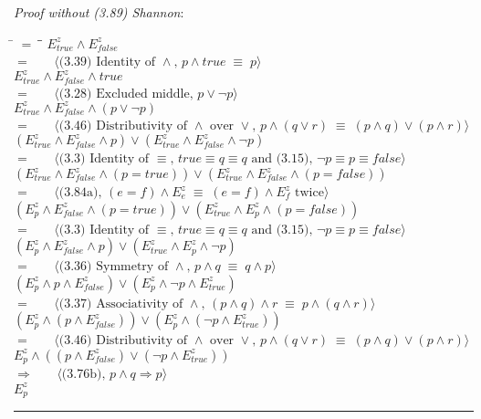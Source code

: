 \documentclass[12pt, fleqn, leqno]{article}
\newcommand{\lgap}{2pt}                             %
\newcommand{\mymathindent}{24pt}                    %
\newcommand{\equivs}{\ensuremath{\;\equiv\;}}       %
\newcommand{\impl}{\ensuremath{\Rightarrow}}        %
\newcommand{\myqed}{\rule[-.23ex]{1.2ex}{2.0ex}}
\newcommand{\myqedtab}{\hspace{384pt}}              %
\newcommand{\Gll} {\langle}                         %
\newcommand{\Ggg} {\rangle}                         %
\newcommand{\Hint}[1]     {\ \ \ $\Gll              \mbox{#1} \Ggg$ }   %
\begin{document}
\emph{Proof without (3.89) Shannon}:
\begin{tabbing}
\hspace{\mymathindent} \= $= \;$ \= \myqedtab \= \kill
	\> \>  $E^{z}_{true}\land E^{z}_{false}$\\
	\> $=$  \>  \Hint{(3.39) Identity of $\land$, $p \land true \equivs p$}\\[\lgap]
	\> \>   $E^{z}_{true}\land E^{z}_{false}\land {true}$\\
	\> $=$  \>  \Hint{(3.28) Excluded middle, $p \lor \lnot p$}\\[\lgap]
	\> \>   $E^{z}_{true}\land E^{z}_{false}\land(p\lor\lnot p)$\\
	\> $=$  \>  \Hint{(3.46) Distributivity of $\land$ over $\lor$, $p \land (q \lor r) \equivs (p \land q) \lor (p \land r)$}\\[\lgap]
	\> \>   $(E^{z}_{true}\land E^{z}_{false}\land p)\lor(E^{z}_{true}\land E^{z}_{false}\land\lnot p)$\\
	\> $=$  \>  \Hint{(3.3) Identity of $\equiv$, $true \equiv q \equiv q$ and (3.15), $\lnot p \equiv p \equiv false$}\\[\lgap]
	\> \>   $(E^{z}_{true}\land E^{z}_{false}\land (p=true))\lor(E^{z}_{true}\land E^{z}_{false}\land (p=false))$\\
	\> $=$  \>  \Hint{(3.84a), $(e = f) \land E^{z}_{e} \equivs (e = f) \land E^{z}_{f}$ twice}\\[\lgap]
	\> \>   $(E^{z}_{p}\land E^{z}_{false}\land (p=true))\lor(E^{z}_{true}\land E^{z}_{p}\land (p=false))$\\
	\> $=$  \>  \Hint{(3.3) Identity of $\equiv$, $true \equiv q \equiv q$ and (3.15), $\lnot p \equiv p \equiv false$}\\[\lgap]
	\> \>   $(E^{z}_{p}\land E^{z}_{false}\land p)\lor(E^{z}_{true}\land E^{z}_{p}\land\lnot p)$\\
	\> $=$  \>  \Hint{(3.36) Symmetry of $\land$, $p \land q \equivs q \land p$}\\[\lgap]
	\> \>  $(E^{z}_{p}\land p\land E^{z}_{false})\lor(E^{z}_{p}\land \lnot p\land E^{z}_{true})$\\
	\> $=$  \>  \Hint{(3.37) Associativity of $\land$, $(p \land q) \land r \equivs p \land (q \land r)$}\\[\lgap]
	\> \>  $(E^{z}_{p}\land (p\land E^{z}_{false}))\lor(E^{z}_{p}\land (\lnot p\land E^{z}_{true}))$\\
	\> $=$  \>  \Hint{(3.46) Distributivity of $\land$ over $\lor$, $p \land (q \lor r) \equivs (p \land q) \lor (p \land r)$}\\[\lgap]
	\> \>   $E^{z}_{p}\land ((p\land E^{z}_{false})\lor (\lnot p\land E^{z}_{true}))$\\
	\> $\impl$  \>  \Hint{(3.76b), $p \land q \impl p$}\\[\lgap]
	\> \>   $E^{z}_{p}$ \quad \myqed \\

\end{tabbing}
\end{document}
